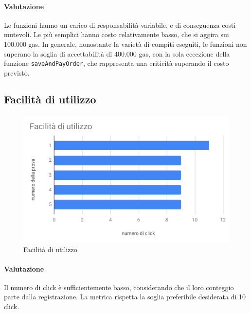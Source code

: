 \paragraph*{Valutazione}
Le funzioni hanno un carico di responsabilità variabile, e di conseguenza costi mutevoli.
Le più semplici hanno costo relativamente basso, che si aggira sui 100.000 gas. 
In generale, nonostante la varietà di compiti eseguiti, le funzioni non superano la soglia di accettabilità di 400.000 gas, con la sola eccezione della funzione \texttt{saveAndPayOrder}, che rappresenta una criticità superando il costo previsto.

\subsection{Facilità di utilizzo}
\begin{figure}[H]
	\centering
	\includegraphics[scale=0.6]{res/images/RA/facilita-di-utilizzo.pdf}
	\caption{Facilità di utilizzo}
\end{figure}
\paragraph*{Valutazione}
Il numero di click è sufficientemente basso, considerando che il loro conteggio parte dalla registrazione.
La metrica rispetta la soglia preferibile desiderata di 10 click.

